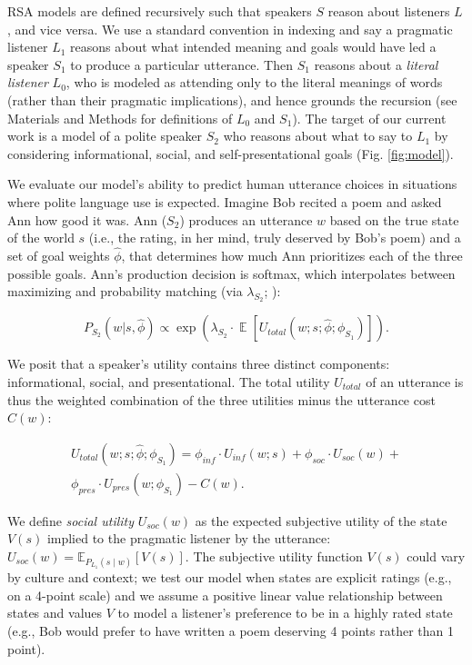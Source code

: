 \documentclass[9pt,twocolumn,twoside,lineno]{main_class_file}
\begin{document}
RSA models are defined recursively such that speakers \(S\)  reason about
listeners  \(L\), and vice versa. We use a standard convention in indexing and say a pragmatic listener \(L_1\) reasons about what intended meaning
and goals would have led a speaker \(S_1\) to produce a particular
utterance. Then \(S_1\) reasons about a \emph{literal listener}
\(L_0\), who is modeled as attending only to the literal meanings of words
(rather than their pragmatic implications), and hence grounds the
recursion (see Materials and Methods for definitions of $L_0$ and $S_1$).
The target of our current work is a model of a polite speaker \(S_2\)
who reasons about what to say to \(L_1\) by
considering informational, social, and self-presentational goals (Fig.
\ref{fig:model}).

We evaluate our model's ability to predict human utterance choices
in situations where polite language use is expected.
Imagine Bob recited a poem and asked Ann how good it was.
Ann (\(S_2\)) produces an utterance \(w\) based on the true state of the world \(s\) (i.e., the
rating, in her mind, truly deserved by Bob's poem) and a set of goal weights
\(\hat{\phi}\), that determines how much Ann prioritizes each of the three possible goals.
Ann's production decision is softmax, which interpolates between
maximizing and probability matching (via \(\lambda_{S_2}\); \cite{goodman2013}):

\begin{equation}
P_{S_2}(w | s, \hat{\phi}) \propto \exp(\lambda_{S_2} \cdot \mathop{\mathbb{E}}[U_{total}(w; s; \hat{\phi}; \phi_{S_1})]).
\end{equation}

We posit that a speaker's utility contains three distinct components: informational, social, and presentational. The
total utility $U_{total}$ of an utterance is thus the weighted combination of the three utilities minus the utterance cost \(C(w)\):

\begin{equation}
\begin{split}
U_{total}(w; s; \hat{\phi}; \phi_{S_1}) = \phi_{inf} \cdot U_{inf}(w; s) + \phi_{soc} \cdot U_{soc}(w) + \\ \phi_{pres} \cdot U_{pres}(w; \phi_{S_1}) - C(w).
\end{split}
\end{equation}

We define \emph{social utility} \(U_{soc}(w)\) as the expected subjective utility of the state \(V(s)\) implied to the
pragmatic listener by the utterance: \(U_{soc}(w) = \mathbb{E}_{P_{L_1}(s \mid w)}[V(s)]\).
The subjective utility function \(V(s)\) could vary by culture and context; we test our model when states are explicit ratings (e.g., on a 4-point scale) and we assume a positive linear value relationship between states and values \(V\) to model a listener's preference to be in a highly rated state (e.g., Bob would prefer to have written a poem deserving 4 points rather than 1 point).
\end{document}
